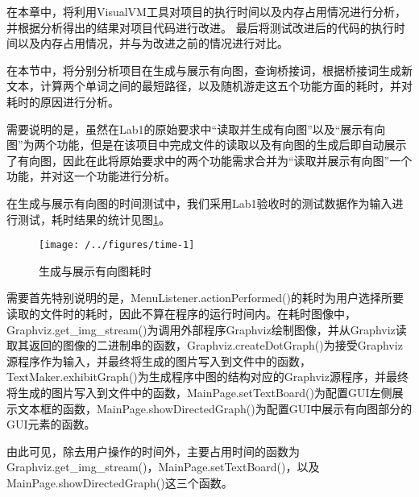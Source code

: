 在本章中，将利用VisualVM工具对项目的执行时间以及内存占用情况进行分析，并根据分析得出的结果对项目代码进行改进。
最后将测试改进后的代码的执行时间以及内存占用情况，并与为改进之前的情况进行对比。

在本节中，将分别分析项目在生成与展示有向图，查询桥接词，根据桥接词生成新文本，计算两个单词之间的最短路径，以及随机游走这五个功能方面的耗时，并对耗时的原因进行分析。

需要说明的是，虽然在Lab1的原始要求中“读取并生成有向图”以及“展示有向图”为两个功能，但是在该项目中完成文件的读取以及有向图的生成后即自动展示了有向图，因此在此将原始要求中的两个功能需求合并为“读取并展示有向图”一个功能，并对这一个功能进行分析。

在生成与展示有向图的时间测试中，我们采用Lab1验收时的测试数据作为输入进行测试，耗时结果的统计见图\ref{fig:time-1}。

\begin{figure}
\centering
\texttt{[image: /../figures/time-1]}
\caption{生成与展示有向图耗时}
\label{fig:time-1}
\end{figure}

需要首先特别说明的是，MenuListener.actionPerformed()的耗时为用户选择所要读取的文件时的耗时，因此不算在程序的运行时间内。在耗时图像中，Graphviz.get\_img\_stream()为调用外部程序Graphviz绘制图像，并从Graphviz读取其返回的图像的二进制串的函数，Graphviz.createDotGraph()为接受Graphviz源程序作为输入，并最终将生成的图片写入到文件中的函数，TextMaker.exhibitGraph()为生成程序中图的结构对应的Graphviz源程序，并最终将生成的图片写入到文件中的函数，MainPage.setTextBoard()为配置GUI左侧展示文本框的函数，MainPage.showDirectedGraph()为配置GUI中展示有向图部分的GUI元素的函数。

由此可见，除去用户操作的时间外，主要占用时间的函数为Graphviz.get\_img\_stream()，MainPage.setTextBoard()，以及MainPage.showDirectedGraph()这三个函数。







